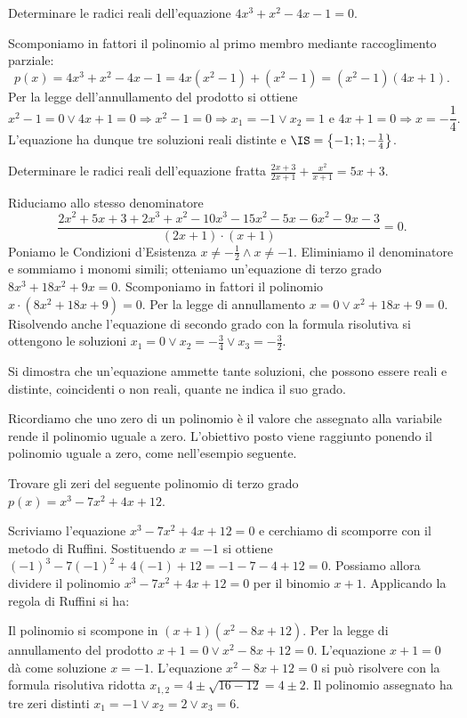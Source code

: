\begin{exrig}
\begin{esempio}
Determinare le radici reali dell'equazione $4x^3+x^2-4x-1=0$.

Scomponiamo in fattori il polinomio al primo membro mediante raccoglimento 
parziale: 
\[p(x)=4x^3+x^2-4x-1=4x \left(x^2-1\right)+\left(x^2-1\right)=\left(x^2-1\right) 
(4x+1).\] 
Per la legge dell'annullamento del prodotto si ottiene 
\[x^2-1=0\vee 4x+1=0 \Rightarrow x^2-1=0\Rightarrow x_1=-1\vee x_2=1\text{ e 
}4x+1=0\Rightarrow x=-\frac{1}{4}.\] L'equazione ha dunque tre soluzioni reali 
distinte e $\IS=\left\{-1;1;-\frac 1 4\right\}$.
\end{esempio}
\begin{esempio}
Determinare le radici reali dell'equazione fratta 
$\frac{2x+3}{2x+1}+\frac{x^2}{x+1}=5x+3$.

Riduciamo allo stesso denominatore 
\[\frac{2x^2+5x+3+2x^3+x^2-10x^3-15x^2-5x-6x^2-9x-3}{(2x+1)\cdot (x+1)}=0.\]
Poniamo le Condizioni d'Esistenza $x\neq -\frac 1 2\wedge x\neq -1$. Eliminiamo 
il denominatore e sommiamo i monomi simili; otteniamo un'equazione di terzo 
grado $8x^3+18x^2+9x=0$. Scomponiamo in fattori il polinomio $x\cdot 
\left(8x^2+18x+9\right)=0$. Per la legge di annullamento $x=0\vee x^2+18x+9=0$. 
Risolvendo anche l'equazione di secondo grado con la formula risolutiva si 
ottengono le soluzioni $x_1=0\vee x_2=-\frac 3 4\vee x_3=-\frac 3 2$.

\osservazione
Si dimostra che un'equazione ammette tante soluzioni, che possono essere reali e 
distinte, coincidenti o non reali, quante ne indica il suo grado.

Ricordiamo che uno zero di un polinomio è il valore che assegnato alla variabile 
rende il polinomio uguale a zero. L'obiettivo posto viene raggiunto ponendo il 
polinomio uguale a zero, come nell'esempio seguente.
\end{esempio}

\begin{esempio}
Trovare gli zeri del seguente polinomio di terzo grado $p(x)=x^3-7x^2+4x+12$.

Scriviamo l'equazione $x^3-7x^2+4x+12=0$ e cerchiamo di scomporre con il metodo 
di Ruffini. Sostituendo $x=-1$ si ottiene $(-1)^3-7(-1)^2+4(-1)+12=-1-7-4+12=0$. 
Possiamo allora dividere il polinomio $x^3-7x^2+4x+12=0$ per il binomio $x+1$. 
Applicando la regola di Ruffini si ha:
\begin{center}

\end{center}
Il polinomio si scompone in $(x+1)(x^2-8x+12)$. Per la legge di annullamento del 
prodotto $x+1=0\vee x^2-8x+12=0$. L'equazione $x+1=0$ dà come soluzione $x=-1$. 
L'equazione $x^2-8x+12=0$ si può risolvere con la formula risolutiva ridotta 
$x_{1,2}=4\pm \sqrt{16-12}=4\pm 2$. Il polinomio assegnato ha tre zeri distinti 
$x_1=-1\vee x_2=2\vee x_3=6$.
\end{esempio}
\end{exrig}

